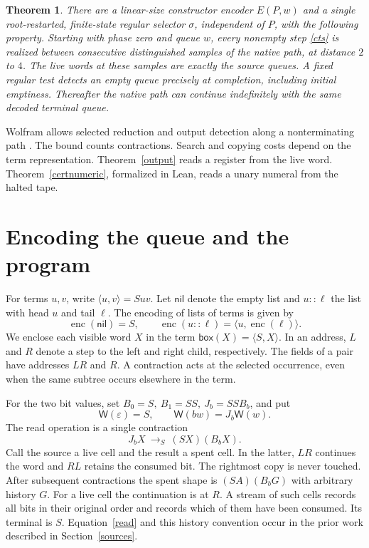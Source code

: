 \documentclass[11pt,letterpaper,oneside,reqno]{amsart}
\newtheorem{theorem}{Theorem}
\newcommand{\eps}{\varepsilon}
\newcommand{\pair}[2]{\langle #1,#2\rangle}
\newcommand{\word}{\mathsf W}
\newcommand{\bx}[1]{\mathsf{box}(#1)}
\newcommand{\Rule}{\longrightarrow_S}
\begin{document}
\begin{theorem}\label{main}
There are a linear-size constructor encoder \(E(P,w)\) and a single root-restarted, finite-state regular selector \(\sigma\), independent of \(P\), with the following property. Starting with phase zero and queue \(w\), every nonempty step \eqref{cts} is realized between consecutive distinguished samples of the native path, at distance \(2\) to \(4\). The live words at these samples are exactly the source queues. A fixed regular test detects an empty queue precisely at completion, including initial emptiness. Thereafter the native path can continue indefinitely with the same decoded terminal queue.
\end{theorem}

Wolfram allows selected reduction and output detection along a nonterminating path \cite{announcement,prize}. The bound counts contractions. Search and copying costs depend on the term representation. Theorem~\ref{output} reads a register from the live word. Theorem~\ref{certnumeric}, formalized in Lean, reads a unary numeral from the halted tape.

\section{Encoding the queue and the program}
For terms \(u,v\), write \(\pair u v=Suv\). Let \(\mathsf{nil}\) denote the empty list and \(u::\ell\) the list with head \(u\) and tail \(\ell\). The encoding of lists of terms is given by
\[
  \operatorname{enc}(\mathsf{nil})=S,\qquad
  \operatorname{enc}(u::\ell)=\pair{u}{\operatorname{enc}(\ell)}.
\]
We enclose each visible word \(X\) in the term \(\bx{X}=\pair S X\). In an address, \(L\) and \(R\) denote a step to the left and right child, respectively. The fields of a pair have addresses \(LR\) and \(R\). A contraction acts at the selected occurrence, even when the same subtree occurs elsewhere in the term.

For the two bit values, set \(B_0=S,\ B_1=SS,\ J_b=SSB_b\), and put
\[
 \word(\eps)=S,\qquad \word(bw)=J_b\word(w).
\]
The read operation is a single contraction
\begin{equation}
 J_bX\ \Rule\ (SX)(B_bX).                                    \label{read}
\end{equation}
Call the source a live cell and the result a spent cell. In the latter, \(LR\) continues the word and \(RL\) retains the consumed bit. The rightmost copy is never touched. After subsequent contractions the spent shape is \((SA)(B_bG)\) with arbitrary history \(G\). For a live cell the continuation is at \(R\). A stream of such cells records all bits in their original order and records which of them have been consumed. Its terminal is \(S\). Equation~\eqref{read} and this history convention occur in the prior work described in Section~\ref{sources}.
\end{document}
